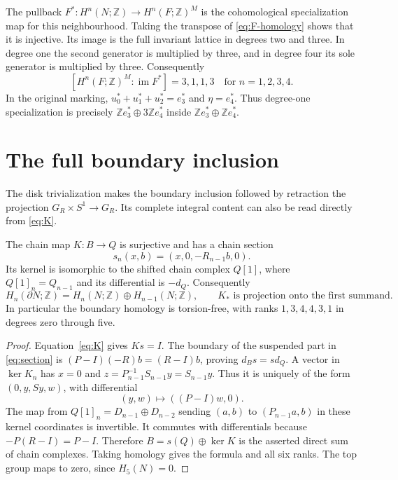 \documentclass[11pt]{article}
\numberwithin{equation}{section}
\providecommand{\Z}{\mathbb Z}
\providecommand{\im}{\operatorname{im}}
\begin{document}
The pullback $F^*:H^n(N;\Z)\to H^n(F;\Z)^M$ is the
cohomological specialization map for this neighbourhood.
Taking the transpose of \eqref{eq:F-homology} shows that it is
injective. Its image is the
full invariant lattice in degrees two and three. In degree one the
second generator is multiplied by three, and in degree four its sole
generator is multiplied by three. Consequently
\begin{equation}\label{eq:specialization-indices}
 [H^n(F;\Z)^M:\im F^*]=3,1,1,3
                         \quad\text{for }n=1,2,3,4.
\end{equation}
In the original marking,
$u_0^*+u_1^*+u_2^*=e_3^*$ and $\eta=e_4^*$.
Thus degree-one specialization is precisely
$\Z e_3^*\oplus3\Z e_4^*$ inside
$\Z e_3^*\oplus\Z e_4^*$.

\section{The full boundary inclusion}

The disk trivialization makes the boundary inclusion followed by
retraction the projection $G_R\times S^1\to G_R$.
Its complete integral content can also be read directly from
\eqref{eq:K}.

\begin{proposition}\label{prop:boundary-splitting}
The chain map $K:B\to Q$ is surjective and has a chain section
\begin{equation}\label{eq:section}
 s_n(x,b)=(x,0,-R_{n-1}b,0).
\end{equation}
Its kernel is isomorphic to the shifted chain complex $Q[1]$, where
$Q[1]_n=Q_{n-1}$ and its differential is $-d_Q$.
Consequently
\[
 H_n(\partial N;\Z)=H_n(N;\Z)\oplus H_{n-1}(N;\Z),
 \qquad K_*\text{ is projection onto the first summand}.
\]
In particular the boundary homology is torsion-free, with ranks
$1,3,4,4,3,1$ in degrees zero through five.
\end{proposition}
\begin{proof}
Equation~\eqref{eq:K} gives $Ks=I$. The boundary of the suspended
part in \eqref{eq:section} is
$(P-I)(-R)b=(R-I)b$, proving $d_Bs=sd_Q$.
A vector in $\ker K_n$ has $x=0$ and
$z=P_{n-1}^{-1}S_{n-1}y=S_{n-1}y$. Thus it is uniquely of the
form $(0,y,Sy,w)$, with differential
\[
                    (y,w)\longmapsto((P-I)w,0).
\]
The map from $Q[1]_n=D_{n-1}\oplus D_{n-2}$ sending
$(a,b)$ to $(P_{n-1}a,b)$ in these kernel coordinates is invertible.
It commutes with differentials because $-P(R-I)=P-I$.
Therefore $B=s(Q)\oplus\ker K$ is the asserted direct sum of
chain complexes. Taking homology gives the formula and all six ranks.
The top group maps to zero, since $H_5(N)=0$.
\end{proof}
\end{document}
